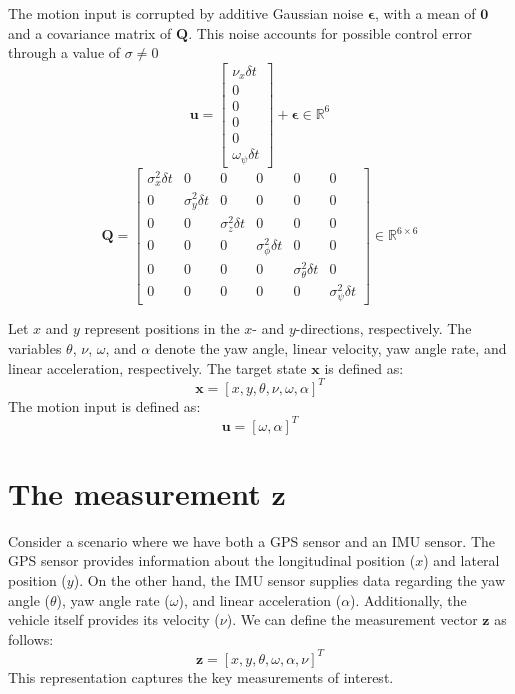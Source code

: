 \documentclass[12pt, a4paper]{article}
\begin{document}
The motion input is corrupted by additive Gaussian noise $\bm{\epsilon}$, with a
mean of $\bm{0}$ and a covariance matrix of $\bm{Q}$. This noise accounts for
possible control error through a value of $\sigma\neq 0$
\[
  \bm{u}=\begin{bmatrix}
    \nu_{x}\delta t\\
    0\\
    0\\
    0\\
    0\\
    \omega_{\psi} \delta t
  \end{bmatrix}+\bm{\epsilon}\in \mathbb{R}^{6}
\]
\[
  \bm{Q}=\begin{bmatrix}
    \sigma_{x}^{2}\delta t & 0 & 0 & 0 & 0 & 0\\
    0 & \sigma_{y}^{2}\delta t & 0 & 0 & 0 & 0\\
    0 & 0 & \sigma_{z}^{2}\delta t & 0 & 0 & 0\\
    0 & 0 & 0 & \sigma_{\phi}^{2} \delta t & 0 & 0\\
    0 & 0 & 0 & 0 & \sigma_{\theta}^{2} \delta t & 0\\
    0 & 0 & 0 & 0 & 0 & \sigma_{\psi}^{2} \delta t
  \end{bmatrix}\in \mathbb{R}^{6 \times 6}
\]


Let $x$ and $y$ represent positions in the $x$- and $y$-directions, respectively. The variables $\theta$, $\nu$, $\omega$, and $\alpha$ denote the yaw angle, linear velocity, yaw angle rate, and linear acceleration, respectively. The target state $\bm{x}$ is defined as:
\[
  \bm{x} = [x, y, \theta, \nu, \omega, \alpha]^{T}
\]
The motion input is defined as:
\[
  \bm{u} = [\omega, \alpha]^{T}
\]

\section{The measurement $\bm{z}$}
Consider a scenario where we have both a GPS sensor and an IMU sensor. The GPS sensor provides information about the longitudinal position ($x$) and lateral position ($y$). On the other hand, the IMU sensor supplies data regarding the yaw angle ($\theta$), yaw angle rate ($\omega$), and linear acceleration ($\alpha$). Additionally, the vehicle itself provides its velocity ($\nu$). We can define the measurement vector $\bm{z}$ as follows:
\[
  \bm{z} = [x, y, \theta, \omega, \alpha, \nu]^{T}
\]
This representation captures the key measurements of interest.
\end{document}
